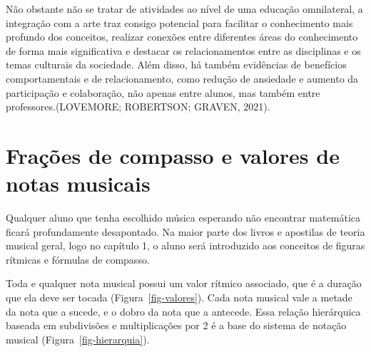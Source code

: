 \documentclass[
  letterpaper,
  DIV=11,
  numbers=noendperiod]{scrreprt}
\begin{document}
Não obstante não se tratar de atividades ao nível de uma educação
omnilateral, a integração com a arte traz consigo potencial para
facilitar o conhecimento mais profundo dos conceitos, realizar conexões
entre diferentes áreas do conhecimento de forma mais significativa e
destacar os relacionamentos entre as disciplinas e os temas culturais da
sociedade. Além disso, há também evidências de benefícios
comportamentais e de relacionamento, como redução de ansiedade e aumento
da participação e colaboração, não apenas entre alunos, mas também entre
professores.(LOVEMORE; ROBERTSON; GRAVEN, 2021).

\section{Frações de compasso e valores de notas
musicais}\label{frauxe7uxf5es-de-compasso-e-valores-de-notas-musicais}

Qualquer aluno que tenha escolhido música esperando não encontrar
matemática ficará profundamente desapontado. Na maior parte dos livros e
apostilas de teoria musical geral, logo no capítulo 1, o aluno será
introduzido aos conceitos de figuras rítmicas e fórmulas de compasso.

Toda e qualquer nota musical possui um valor rítmico associado, que é a
duração que ela deve ser tocada (Figura~\ref{fig-valores}). Cada nota
musical vale a metade da nota que a sucede, e o dobro da nota que a
antecede. Essa relação hierárquica baseada em subdivisões e
multiplicações por 2 é a base do sistema de notação musical
(Figura~\ref{fig-hierarquia}).
\end{document}
